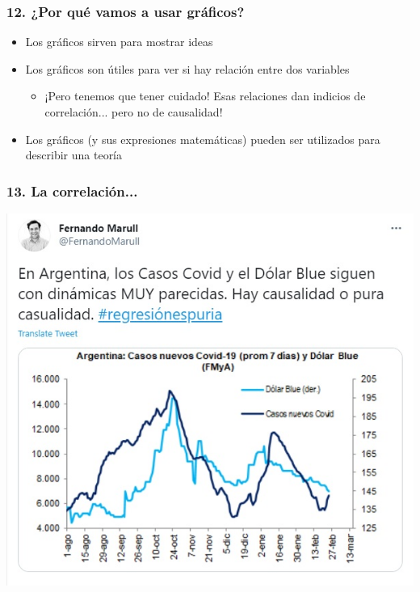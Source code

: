 \documentclass{beamer}
\begin{document}
\begin{frame}
\frametitle{12. ¿Por qué vamos a usar gráficos?}
\begin{itemize}
    \item Los gráficos sirven para mostrar ideas \vspace{2mm}
    \item Los gráficos son útiles para ver si hay relación entre dos variables 
     \begin{itemize}
        \item ¡Pero tenemos que tener cuidado! Esas relaciones dan indicios de correlación... pero no de causalidad! \vspace{2mm}
    \end{itemize}
    \item Los gráficos (y sus expresiones matemáticas) pueden ser utilizados para describir una teoría
\end{itemize} 
\end{frame}

\begin{frame}
\frametitle{13. La correlación...}
\begin{center}
    \includegraphics[scale=0.55]{Figures/Introduccion_1.3.jpg}
\end{center}
\end{frame}
\end{document}
